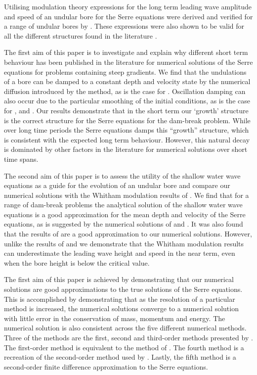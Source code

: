 \documentclass[times]{elsarticle}
\begin{document}
Utilising modulation theory expressions for the long term leading wave amplitude and speed of an undular bore for the Serre equations were derived and verified for a range of undular bores by \citet{El-etal-2006}. These expressions were also shown to be valid for all the different structures found in the literature \cite{El-etal-2006,Mitsotakis-etal-2014}.


The first aim of this paper is to investigate and explain why different short term behaviour has been published in the literature for numerical solutions of the Serre equations for problems containing steep gradients. We find that the undulations of a bore can be damped to a constant depth and velocity state by the numerical diffusion introduced by the method, as is the case for \citet{Hank-etal-2010-2034}. Oscillation damping can also occur due to the particular smoothing of the initial conditions, as is the case for \citet{Mitsotakis-etal-2017}, \citet{El-etal-2006} and \citet{Mitsotakis-etal-2014}. Our results demonstrate that in the short term our `growth' structure is the correct structure for the Serre equations for the dam-break problem. While over long time periods the Serre equations damps this ``growth'' structure, which is consistent with the expected long term behaviour. However, this natural decay is dominated by other factors in the literature for numerical solutions over short time spans.

The second aim of this paper is to assess the utility of the shallow water wave equations as a guide for the evolution of an undular bore and compare our numerical solutions with the Whitham modulation results of \citet{El-etal-2006}. We find that for a range of dam-break problems the analytical solution of the shallow water wave equations is a good approximation for the mean depth and velocity of the Serre equations, as is suggested by the numerical solutions of \citet{Hank-etal-2010-2034} and \citet{Mitsotakis-etal-2014}. It was also found that the results of \citet{El-etal-2006} are a good approximation to our numerical solutions. However, unlike the results of \citet{El-etal-2006} and \citet{Mitsotakis-etal-2014} we demonstrate that the Whitham modulation results can underestimate the leading wave height and speed in the near term, even when the bore height is below the critical value.

The first aim of this paper is achieved by demonstrating that our numerical solutions are good approximations to the true solutions of the Serre equations. This is accomplished by demonstrating that as the resolution of a particular method is increased, the numerical solutions converge to a numerical solution with little error in the conservation of mass, momentum and energy. The numerical solution is also consistent across the five different numerical methods. Three of the methods are the first, second and third-order methods presented by \citet{Zoppou-etal-2017}. The first-order method is equivalent to the method of \citet{Hank-etal-2010-2034}. The fourth method is a recreation of the second-order method used by \citet{El-etal-2006}. Lastly, the fifth method is a second-order finite difference approximation to the Serre equations. 
\end{document}
